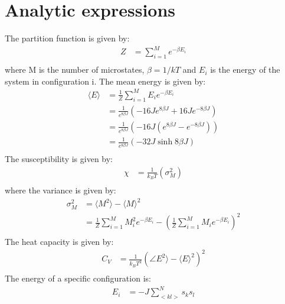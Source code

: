 \documentclass{article}
\begin{document}
\section{Analytic expressions}
The partition function is given by:
\begin{align*}
  Z&= \sum_{i=1}^{M}e^{-\beta E_i}\\
\end{align*}
where M is the number of microstates, $\beta = 1/kT$ and $E_i$ is the energy of the system in configuration i.
The mean energy is given by:
\begin{align*}
  \langle E\rangle &= \frac{1}{Z}\sum^{M}_{i=1}E_i e^{-\beta E_i}\\
  &= \frac{1}{e^{8\beta J}}\left(-16Je^{8\beta J}+16Je^{-8\beta J}\right)\\
  &= \frac{1}{e^{8\beta J}}\left(-16J\left(e^{8\beta J}-e^{-8\beta J}\right)\right)\\
  &= \frac{1}{e^{8\beta J}}\left(-32J\sinh{8\beta J}\right)\\
\end{align*}
The susceptibility is given by:
\begin{align*}
  \chi &= \frac{1}{k_B T}\left(\sigma_M^2\right)\\
\end{align*}
where the variance is given by:
\begin{align*}
  \sigma^2_M &= \langle M^2\rangle -\langle M \rangle^2\\
  &= \frac{1}{Z}\sum^M_{i=1} M_i^2 e^{-\beta E_i}-\left(\frac{1}{Z}\sum^M_{i=1}M_i e^{-\beta E_i}\right)^2\\
\end{align*}
The heat capacity is given by:
\begin{align*}
  C_V &= \frac{1}{k_B T^2}\left(\angle E^2 \rangle - \langle E \rangle^2 \right)^2\\
\end{align*}
The energy of a specific configuration is:
\begin{align*}
  E_i &= -J\sum^N_{<kl>}s_k s_l\\
\end{align*}
\end{document}
